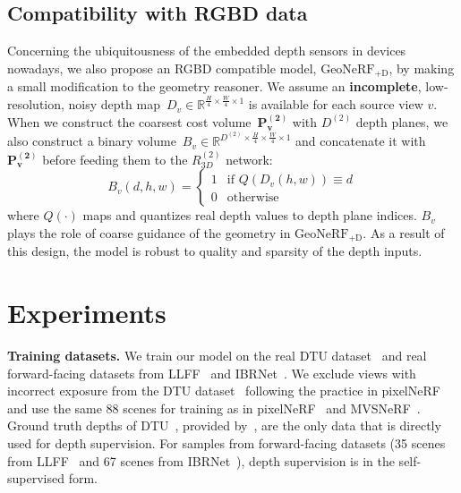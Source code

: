 \subsection{Compatibility with RGBD data} \label{sec:c3_rgbd_method}
Concerning the ubiquitousness of the embedded depth sensors in devices nowadays, we also propose an RGBD compatible model, $\text{GeoNeRF}_{\text{+D}}$, by making a small modification to the geometry reasoner. We assume an \textbf{incomplete}, low-resolution, noisy depth map~$D_{v} \in \mathbb{R}^{\frac{H}{4} \times \frac{W}{4} \times 1}$ is available for each source view $v$. When we construct the coarsest cost volume~$\boldsymbol{P^{(2)}_{v}}$ with $D^{(2)}$ depth planes, we also construct a binary volume~$B_{v} \in \mathbb{R}^{D^{(2)} \times \frac{H}{4} \times \frac{W}{4} \times 1}$ and concatenate it with $\boldsymbol{P^{(2)}_{v}}$ before feeding them to the $R^{(2)}_{3D}$ network:
\begin{equation}
    B_{v}(d,h,w) = \begin{cases} 
    1 &\mbox{if } Q \left( D_{v} \left(h,w \right) \right) \equiv d \\
    0 & \mbox{otherwise} 
    \end{cases}
\end{equation}
where $Q(\cdot)$ maps and quantizes real depth values to depth plane indices. $B_{v}$ plays the role of coarse guidance of the geometry in $\text{GeoNeRF}_{\text{+D}}$. As a result of this design, the model is robust to quality and sparsity of the depth inputs.

\section{Experiments} \label{sec:c3_experiments}
\noindent\textbf{Training datasets.} We train our model on the real DTU dataset~\cite{jensen2014large} and real forward-facing datasets from LLFF~\cite{mildenhall2019llff} and IBRNet~\cite{wang2021ibrnet}. We exclude views with incorrect exposure from the DTU dataset~\cite{jensen2014large} following the practice in pixelNeRF~\cite{yu2021pixelnerf} and use the same 88 scenes for training as in pixelNeRF~\cite{yu2021pixelnerf} and MVSNeRF~\cite{chen2021mvsnerf}. Ground truth depths of DTU~\cite{jensen2014large}, provided by~\cite{yao2018mvsnet}, are the only data that is directly used for depth supervision. For samples from forward-facing datasets (35 scenes from LLFF~\cite{mildenhall2019llff} and 67 scenes from IBRNet~\cite{wang2021ibrnet}), depth supervision is in the self-supervised form. \\

